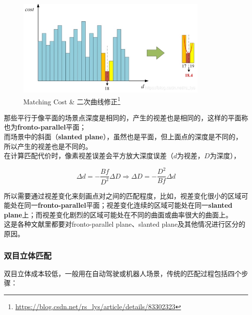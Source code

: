 			\begin{figure}[H]
				\begin{center}
					\includegraphics[width=0.85\textwidth]{../images/matching_cost.jpeg}
				\end{center}
				\caption{Matching Cost \& 二次曲线修正\protect\footnote{\url{https://blog.csdn.net/rs_lys/article/details/83302323}}}
			\end{figure}

			那些平行于像平面的场景点深度是相同的，产生的视差也是相同的，这样的平面称也为\textbf{fronto-parallel}平面；\\

			而场景中的斜面（\textbf{slanted plane}），虽然也是平面，但上面点的深度是不同的，所以产生的视差也是不同的。\\

			在计算匹配代价时，像素视差误差会平方放大深度误差（$d$为视差，$D$为深度），

			$$
				\Delta d= -\frac{Bf}{D^2}\Delta D \Rightarrow \Delta D = -\frac{D^2}{Bf}\Delta d
			$$
			
			所以需要通过视差变化来刻画点对之间的匹配程度，比如，视差变化很小的区域可能处在同一\textbf{fronto-parallel}平面；视差变化连续的区域可能处在同一\textbf{slanted plane}上；而视差变化剧烈的区域可能处在不同的曲面或曲率很大的曲面上。\\

			这是各种文献里都要对fronto-parallel plane、slanted plane及其他情况进行区分的原因。

		\subsubsection*{双目立体匹配}
			双目立体成本较低，一般用在自动驾驶或机器人场景，传统的匹配过程包括四个步骤：

